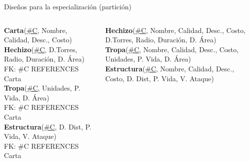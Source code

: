 \begin{frame}{Dise\~nos para la especializaci\'on (partici\'on)}

    \begin{columns}[T]

        \begin{column}{0.48\linewidth}
            \begin{scriptsize}
                
                \textbf{Carta}(\underline{\#C}, Nombre, Calidad, Desc., Costo)\\[2mm]
                \textbf{Hechizo}(\underline{\#C}, D.Torres, Radio, Duraci\'on, D. \'Area)\\[1mm]
                \hspace{4mm} FK: \#C REFERENCES Carta \\[2mm]
                \textbf{Tropa}(\underline{\#C}, Unidades, P. Vida, D. \'Area)\\[1mm]
                \hspace{4mm} FK: \#C REFERENCES Carta \\[2mm]
                
                \textbf{Estructura}(\underline{\#C}, D. Dist, P. Vida, V. Ataque)\\[1mm]
                \hspace{4mm} FK: \#C REFERENCES Carta\\[2mm]
            \end{scriptsize}
        \end{column}

        \begin{column}{0.48\linewidth}

            \begin{scriptsize}
                \textbf{Hechizo}(\underline{\#C}, Nombre, Calidad, Desc., Costo, D.Torres, Radio, Duraci\'on, D. \'Area)\\[1mm]
               
                \textbf{Tropa}(\underline{\#C}, Nombre, Calidad, Desc., Costo, Unidades, P. Vida, D. \'Area)\\[1mm]
               
                \textbf{Estructura}(\underline{\#C}, Nombre, Calidad, Desc., Costo, D. Dist, P. Vida, V. Ataque)\\[1mm]
             
            \end{scriptsize}
        \end{column}
        
    \end{columns}

    \vspace{5mm}


\end{frame}


